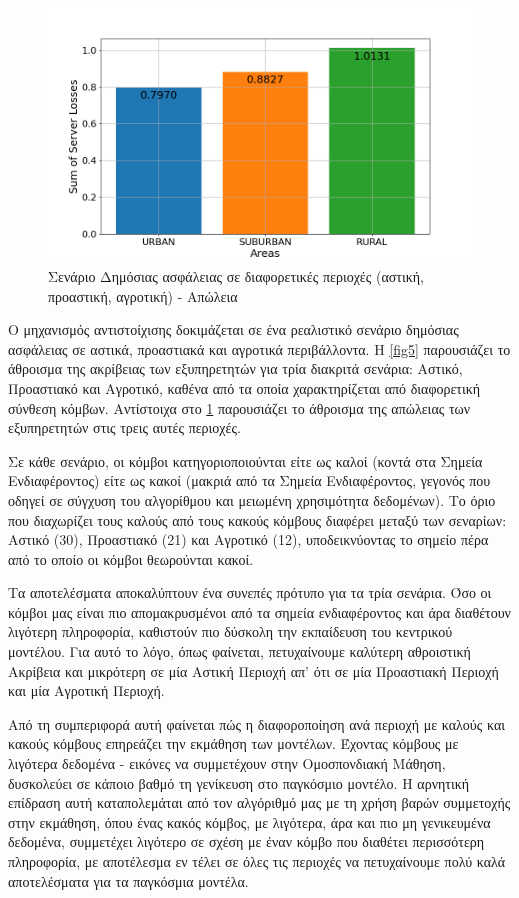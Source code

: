 \begin{figure}[H]
    \centering
    \includegraphics[width=\textwidth]{figures/chapter2/Sum_of_Losses_per_Area.png}
    \caption{Σενάριο Δημόσιας ασφάλειας σε διαφορετικές περιοχές (αστική, προαστική, αγροτική) - Απώλεια}
    \label{fig6}
\end{figure}

\newpage

Ο μηχανισμός αντιστοίχισης δοκιμάζεται σε ένα ρεαλιστικό σενάριο δημόσιας ασφάλειας σε αστικά, προαστιακά και αγροτικά περιβάλλοντα. Η \ref{fig5} παρουσιάζει το άθροισμα της ακρίβειας των εξυπηρετητών για τρία διακριτά σενάρια: Αστικό, Προαστιακό και Αγροτικό, καθένα από τα οποία χαρακτηρίζεται από διαφορετική σύνθεση κόμβων. Αντίστοιχα στο \ref{fig6} παρουσιάζει το άθροισμα της απώλειας των εξυπηρετητών στις τρεις αυτές περιοχές.

Σε κάθε σενάριο, οι κόμβοι κατηγοριοποιούνται είτε ως καλοί (κοντά στα Σημεία Ενδιαφέροντος) είτε ως κακοί (μακριά από τα Σημεία Ενδιαφέροντος, γεγονός που οδηγεί σε σύγχυση του αλγορίθμου και μειωμένη χρησιμότητα δεδομένων). Το όριο που διαχωρίζει τους καλούς από τους κακούς κόμβους διαφέρει μεταξύ των σεναρίων: Αστικό (30), Προαστιακό (21) και Αγροτικό (12), υποδεικνύοντας το σημείο πέρα από το οποίο οι κόμβοι θεωρούνται κακοί.

Τα αποτελέσματα αποκαλύπτουν ένα συνεπές πρότυπο για τα τρία σενάρια. Όσο οι κόμβοι μας είναι πιο απομακρυσμένοι από τα σημεία ενδιαφέροντος και άρα διαθέτουν λιγότερη πληροφορία, καθιστούν πιο δύσκολη την εκπαίδευση του κεντρικού μοντέλου. Για αυτό το λόγο, όπως φαίνεται, πετυχαίνουμε καλύτερη αθροιστική Ακρίβεια και μικρότερη σε μία Αστική Περιοχή απ' ότι σε μία Προαστιακή Περιοχή και μία Αγροτική Περιοχή. 

Από τη συμπεριφορά αυτή φαίνεται πώς η διαφοροποίηση ανά περιοχή με καλούς και κακούς κόμβους επηρεάζει την εκμάθηση των μοντέλων. Έχοντας κόμβους με λιγότερα δεδομένα - εικόνες να συμμετέχουν στην Ομοσπονδιακή Μάθηση, δυσκολεύει σε κάποιο βαθμό τη γενίκευση στο παγκόσμιο μοντέλο. Η αρνητική επίδραση αυτή καταπολεμάται από τον αλγόριθμό μας με τη χρήση βαρών συμμετοχής στην εκμάθηση, όπου ένας κακός κόμβος, με λιγότερα, άρα και πιο μη γενικευμένα δεδομένα, συμμετέχει λιγότερο σε σχέση με έναν κόμβο που διαθέτει περισσότερη πληροφορία, με αποτέλεσμα εν τέλει σε όλες τις περιοχές να πετυχαίνουμε πολύ καλά αποτελέσματα για τα παγκόσμια μοντέλα.
